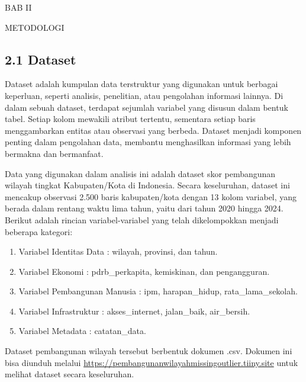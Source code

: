\documentclass[
  12pt,
]{article}
\providecommand{\tightlist}{%
  \setlength{\itemsep}{0pt}\setlength{\parskip}{0pt}}
\begin{document}
\newpage

\begin{center}
  {
    \bfseries
    
    \vfill
    
    \Large
    
    BAB II
    
    METODOLOGI
  }
\end{center}

\subsection{\texorpdfstring{\normalsize 2.1 \hspace {0,5cm}
Dataset}{2.1  Dataset}}\label{dataset}

Dataset adalah kumpulan data terstruktur yang digunakan untuk berbagai
keperluan, seperti analisis, penelitian, atau pengolahan informasi
lainnya. Di dalam sebuah dataset, terdapat sejumlah variabel yang
disusun dalam bentuk tabel. Setiap kolom mewakili atribut tertentu,
sementara setiap baris menggambarkan entitas atau observasi yang
berbeda. Dataset menjadi komponen penting dalam pengolahan data,
membantu menghasilkan informasi yang lebih bermakna dan bermanfaat.

Data yang digunakan dalam analisis ini adalah dataset skor pembangunan
wilayah tingkat Kabupaten/Kota di Indonesia. Secara keseluruhan, dataset
ini mencakup observasi 2.500 baris kabupaten/kota dengan 13 kolom
variabel, yang berada dalam rentang waktu lima tahun, yaitu dari tahun
2020 hingga 2024. Berikut adalah rincian variabel-variabel yang telah
dikelompokkan menjadi beberapa kategori:

\begin{enumerate}
\def\labelenumi{\arabic{enumi}.}
\tightlist
\item
  Variabel Identitas Data : wilayah, provinsi, dan tahun.
\item
  Variabel Ekonomi : pdrb\_perkapita, kemiskinan, dan pengangguran.
\item
  Variabel Pembangunan Manusia : ipm, harapan\_hidup,
  rata\_lama\_sekolah.
\item
  Variabel Infrastruktur : akses\_internet, jalan\_baik, air\_bersih.
\item
  Variabel Metadata : catatan\_data.
\end{enumerate}

Dataset pembangunan wilayah tersebut berbentuk dokumen .csv. Dokumen ini
bisa diunduh melalui
\url{https://pembangunanwilayahmissingoutlier.tiiny.site} untuk melihat
dataset secara keseluruhan.
\end{document}
